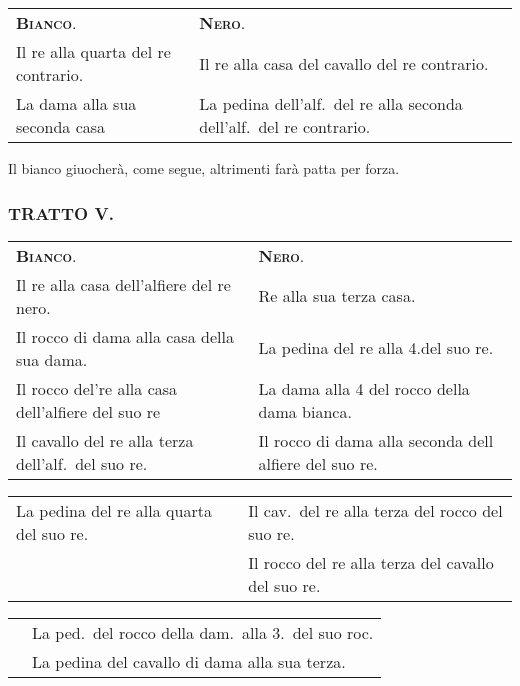 \documentclass[11pt,a6paper]{article}
\begin{document}
{\small
\noindent
\begin{tabular}{@{}p{3.84cm}p{3.84cm}}
{\bfseries\scshape Bianco}. & {\bfseries\scshape Nero}.\\
Il re alla quarta del re contrario. & Il re alla casa del cavallo del re contrario.\\
La dama alla sua seconda casa & La pedina dell'alf.\ del re alla seconda dell'alf.\ del re contrario.\\
\end{tabular}}

Il bianco giuocherà, come segue, altrimenti farà
patta per forza.


\subsubsection{TRATTO V.}

{\small
\noindent
\begin{tabular}{@{}p{3.84cm}p{3.84cm}}
{\bfseries\scshape Bianco}.& {\bfseries\scshape Nero}.\\
Il re alla casa dell'alfiere del re nero.& Re alla sua terza casa.\\
Il rocco di dama alla casa della sua dama.& La pedina del re alla 4.del suo re.\\
Il rocco del're alla casa dell'alfiere del suo re& La dama alla 4 del rocco della dama bianca.\\
Il cavallo del re alla terza dell'alf.\ del suo re.& Il rocco di dama alla seconda dell alfiere del suo re.\\
\end{tabular}

\noindent\begin{tabular}{@{}p{3.84cm}p{3.84cm}}
La pedina del re alla quarta del suo re.& Il cav.\ del re alla terza del rocco del suo re.\\
& Il rocco del re alla terza del cavallo del suo re.\\
\end{tabular}

\noindent\begin{tabular}{@{}p{3.84cm}p{3.84cm}}
& La ped.\ del rocco della dam.\ alla 3.\ del suo roc.\\
& La pedina del cavallo di dama alla sua terza.
\end{tabular}}
\end{document}
